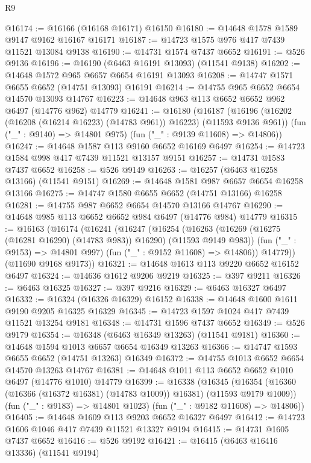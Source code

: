 \begin{lexlean}{R9}
\begin{coremodule}
{{{{{{{{{{{{{{{{{{{{{{{{{{{{{{{{{{{{{{{{{{{{{{{{{{{{{{{{{{{{{{{{{{{{{{{{{{{{{{{{{{{{@16174 := @16166 (@16168 @16171) @16150
@16180 := @14648 @1578 @1589 @9147 @9162 @16167 @16171
@16187 := @14723 @1575 @976 @417 @7439 @11521 @13084 @9138
@16190 := @14731 @1574 @7437 @6652
@16191 := @526 @9136
@16196 := @16190 (@6463 @16191 @13093) (@11541 @9138)
@16202 := @14648 @1572 @965 @6657 @6654 @16191 @13093
@16208 := @14747 @1571 @6655 @6652 (@14751 @13093) @16191
@16214 := @14755 @965 @6652 @6654 @14570 @13093 @14767
@16223 := @14648 @963 @113 @6652 @6652 @962 @6497 (@14776 @962) @14779
@16241 := @16180
    (@16187
      (@16196 (@16202 (@16208 (@16214 @16223) (@14783 @961)) @16223) (@11593 @9136 @961))
      (fun ("_" : @9140) => @14801 @975)
      (fun ("_" : @9139 @11608) => @14806))
@16247 := @14648 @1587 @113 @9160 @6652 @16169 @6497
@16254 := @14723 @1584 @998 @417 @7439 @11521 @13157 @9151
@16257 := @14731 @1583 @7437 @6652
@16258 := @526 @9149
@16263 := @16257 (@6463 @16258 @13166) (@11541 @9151)
@16269 := @14648 @1581 @987 @6657 @6654 @16258 @13166
@16275 := @14747 @1580 @6655 @6652 (@14751 @13166) @16258
@16281 := @14755 @987 @6652 @6654 @14570 @13166 @14767
@16290 := @14648 @985 @113 @6652 @6652 @984 @6497 (@14776 @984) @14779
@16315 := @16163
    (@16174
      (@16241
        (@16247
          (@16254
            (@16263 (@16269 (@16275 (@16281 @16290) (@14783 @983)) @16290) (@11593 @9149 @983))
            (fun ("_" : @9153) => @14801 @997)
            (fun ("_" : @9152 @11608) => @14806))
          @14779))
      (@11690 @9168 @9173))
@16321 := @14648 @1613 @113 @9220 @6652 @16152 @6497
@16324 := @14636 @1612 @9206 @9219
@16325 := @397 @9211
@16326 := @6463 @16325
@16327 := @397 @9216
@16329 := @6463 @16327 @6497
@16332 := @16324 (@16326 @16329) @16152
@16338 := @14648 @1600 @1611 @9190 @9205 @16325 @16329
@16345 := @14723 @1597 @1024 @417 @7439 @11521 @13254 @9181
@16348 := @14731 @1596 @7437 @6652
@16349 := @526 @9179
@16354 := @16348 (@6463 @16349 @13263) (@11541 @9181)
@16360 := @14648 @1594 @1013 @6657 @6654 @16349 @13263
@16366 := @14747 @1593 @6655 @6652 (@14751 @13263) @16349
@16372 := @14755 @1013 @6652 @6654 @14570 @13263 @14767
@16381 := @14648 @1011 @113 @6652 @6652 @1010 @6497 (@14776 @1010) @14779
@16399 := @16338
    (@16345
      (@16354 (@16360 (@16366 (@16372 @16381) (@14783 @1009)) @16381) (@11593 @9179 @1009))
      (fun ("_" : @9183) => @14801 @1023)
      (fun ("_" : @9182 @11608) => @14806))
@16405 := @14648 @1609 @113 @9203 @6652 @16327 @6497
@16412 := @14723 @1606 @1046 @417 @7439 @11521 @13327 @9194
@16415 := @14731 @1605 @7437 @6652
@16416 := @526 @9192
@16421 := @16415 (@6463 @16416 @13336) (@11541 @9194)
}}}}}}}}}}}}}}}}}}}}}}}}}}}}}}}}}}}}}}}}}}}}}}}}}}}}}}}}}}}}}}}}}}}}}}}}}}}}}}}}}}}}
\end{coremodule}
\end{lexlean}
